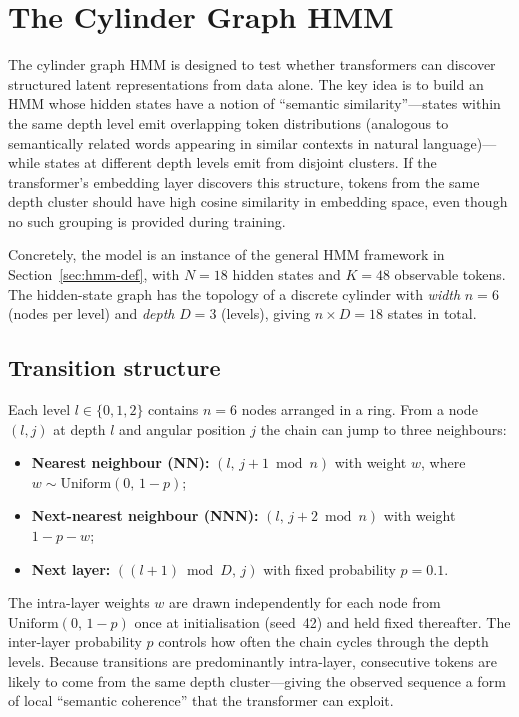 \documentclass[11pt]{article}
\begin{document}
\section{The Cylinder Graph HMM}\label{sec:hmm}

The cylinder graph HMM is designed to test whether transformers can discover structured latent representations from data alone.  The key idea is to build an HMM whose hidden states have a notion of ``semantic similarity''---states within the same depth level emit overlapping token distributions (analogous to semantically related words appearing in similar contexts in natural language)---while states at different depth levels emit from disjoint clusters.  If the transformer's embedding layer discovers this structure, tokens from the same depth cluster should have high cosine similarity in embedding space, even though no such grouping is provided during training.

Concretely, the model is an instance of the general HMM framework in Section~\ref{sec:hmm-def}, with $N = 18$ hidden states and $K = 48$ observable tokens.  The hidden-state graph has the topology of a discrete cylinder with \emph{width} $n = 6$ (nodes per level) and \emph{depth} $D = 3$ (levels), giving $n \times D = 18$ states in total.

\subsection{Transition structure}

Each level $l \in \{0, 1, 2\}$ contains $n = 6$ nodes arranged in a ring.  From a node $(l, j)$ at depth $l$ and angular position $j$ the chain can jump to three neighbours:
\begin{itemize}
  \item \textbf{Nearest neighbour (NN):} $(l,\, j{+}1 \bmod n)$ with weight $w$, where $w \sim \mathrm{Uniform}(0,\, 1{-}p)$;
  \item \textbf{Next-nearest neighbour (NNN):} $(l,\, j{+}2 \bmod n)$ with weight $1 - p - w$;
  \item \textbf{Next layer:} $((l{+}1) \bmod D,\, j)$ with fixed probability $p = 0.1$.
\end{itemize}
The intra-layer weights $w$ are drawn independently for each node from $\mathrm{Uniform}(0,\, 1{-}p)$ once at initialisation (seed~42) and held fixed thereafter.  The inter-layer probability $p$ controls how often the chain cycles through the depth levels.  Because transitions are predominantly intra-layer, consecutive tokens are likely to come from the same depth cluster---giving the observed sequence a form of local ``semantic coherence'' that the transformer can exploit.
\end{document}

